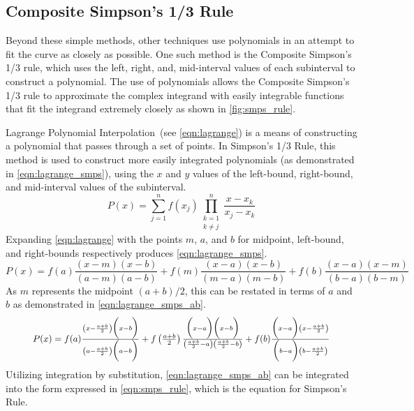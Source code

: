 \documentclass{paper}
\begin{document}
\subsection{Composite Simpson's 1/3 Rule}
\label{sec:smps_rule}
Beyond these simple methods, other techniques use polynomials in an attempt to fit the curve as closely as possible.
One such method is the Composite Simpson's 1/3 rule, which uses the left, right, and, mid-interval values of each subinterval to construct a polynomial.
The use of polynomials allows the Composite Simpson's 1/3 rule to approximate the complex integrand with easily integrable functions that fit the integrand extremely closely as shown in \cref{fig:smps_rule}.
%

%
Lagrange Polynomial Interpolation~(see \cref{eqn:lagrange}) is a means of constructing a polynomial that passes through a set of points.
In Simpson's 1/3 Rule, this method is used to construct more easily integrated polynomials (as demonstrated in \cref{eqn:lagrange_smps}), using the \(x\) and \(y\) values of the left-bound, right-bound, and mid-interval values of the subinterval.
%
\begin{equation}
    \label{eqn:lagrange}
    P(x) = \sum_{j=1}^n f(x_j) \prod_{\substack{k = 1 \\ k \neq j}}^n \frac{x - x_k}{x_j - x_k}
\end{equation}
%
Expanding \cref{eqn:lagrange} with the points \(m\), \(a\), and \(b\) for midpoint, left-bound, and right-bounds respectively produces \cref{eqn:lagrange_smps}.
%
\begin{equation}
    \label{eqn:lagrange_smps}
    P(x) = f(a) \frac{(x - m)(x - b)}{(a - m)(a - b)} + f(m) \frac{(x - a)(x - b)}{(m - a)(m - b)} + f(b) \frac{(x - a)(x - m)}{(b - a)(b - m)}
\end{equation}
%
As \(m\) represents the midpoint \((a + b) / 2\), this can be restated in terms of \(a\) and \(b\) as demonstrated in \cref{eqn:lagrange_smps_ab}.
%
\begin{equation}
    \label{eqn:lagrange_smps_ab}
    \resizebox{.9\textwidth}{!} 
    {
    $P(x) = f(a) \frac{\left(x - \frac{a+b}{2}\right)\biggl(x - b\biggr)}{\left(a - \frac{a+b}{2}\right)\biggl(a - b\biggr)} + f\left(\frac{a+b}{2}\right) \frac{\biggl(x - a\biggr)\biggl(x - b\biggr)}{\left(\frac{a+b}{2} - a\right)\left(\frac{a+b}{2} - b\right)} + f(b) \frac{\biggl(x - a\biggr)\left(x - \frac{a+b}{2}\right)}{\biggl(b - a\biggr)\left(b - \frac{a+b}{2}\right)}$
    }
\end{equation}
%
Utilizing integration by substitution, \cref{eqn:lagrange_smps_ab} can be integrated into the form expressed in \cref{eqn:smps_rule}, which is the equation for Simpson's Rule.
\end{document}
